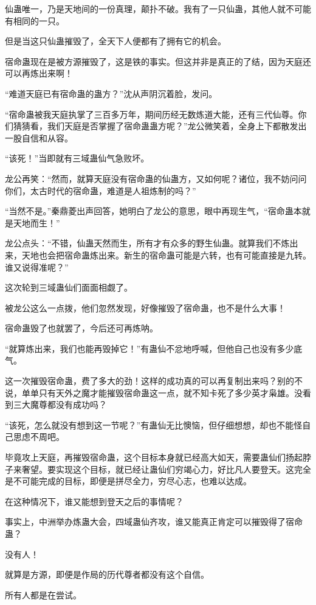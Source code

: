 \begin{this_body}
仙蛊唯一，乃是天地间的一份真理，颠扑不破。我有了一只仙蛊，其他人就不可能有相同的一只。

但是当这只仙蛊摧毁了，全天下人便都有了拥有它的机会。

宿命蛊现在是被方源摧毁了，这是铁的事实。但这并非是真正的了结，因为天庭还可以再炼出来啊！

“难道天庭已有宿命蛊的蛊方？”沈从声阴沉着脸，发问。

“宿命蛊被我天庭执掌了三百多万年，期间历经无数炼道大能，还有三代仙尊。你们猜猜看，我们天庭是否掌握了宿命蛊蛊方呢？”龙公微笑着，全身上下都散发出一股自信和从容。

“该死！”当即就有三域蛊仙气急败坏。

龙公再笑：“然而，就算天庭没有宿命蛊的仙蛊方，又如何呢？诸位，我不妨问问你们，太古时代的宿命蛊，难道是人祖炼制的吗？”

“当然不是。”秦鼎菱出声回答，她明白了龙公的意思，眼中再现生气，“宿命蛊本就是天地而生！”

龙公点头：“不错，仙蛊天然而生，所有才有众多的野生仙蛊。就算我们不炼出来，天地也会把宿命蛊炼出来。新生的宿命蛊可能是六转，也有可能直接是九转。谁又说得准呢？”

这次轮到三域蛊仙们面面相觑了。

被龙公这么一点拨，他们忽然发现，好像摧毁了宿命蛊，也不是什么大事！

宿命蛊毁了也就罢了，今后还可再炼呐。

“就算炼出来，我们也能再毁掉它！”有蛊仙不忿地呼喊，但他自己也没有多少底气。

这一次摧毁宿命蛊，费了多大的劲！这样的成功真的可以再复制出来吗？别的不说，单单只有天外之魔才能摧毁宿命蛊这一点，就不知卡死了多少英才枭雄。没看到三大魔尊都没有成功吗？

“该死，怎么就没有想到这一节呢？”有蛊仙无比懊恼，但仔细想想，却也不能怪自己思虑不周吧。

毕竟攻上天庭，再摧毁宿命蛊，这个目标本身就已经高大如天，需要蛊仙们扬起脖子来奢望。要实现这个目标，就已经让蛊仙们穷竭心力，好比凡人要登天。这完全是不可能完成的目标，即便是拼尽全力，穷尽心志，也难以达成。

在这种情况下，谁又能想到登天之后的事情呢？

事实上，中洲举办炼蛊大会，四域蛊仙齐攻，谁又能真正肯定可以摧毁得了宿命蛊？

没有人！

就算是方源，即便是作局的历代尊者都没有这个自信。

所有人都是在尝试。


\end{this_body}
